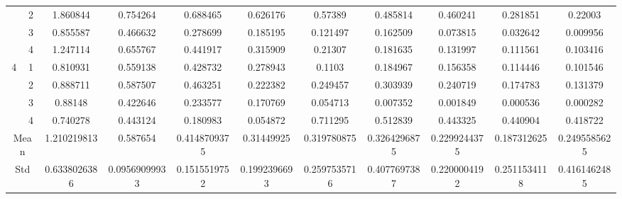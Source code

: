 \documentclass[draft,dvipsnames]{drexel-thesis}
\begin{document}
\begin{thesis}
\begin{table}[!t]
{\begin{tabular}{|c|c|c|c|c|c|c|c|c|c|c|}
                      & 2                   & 1.860844     & 0.754264      & 0.688465     & 0.626176     & 0.57389      & 0.485814     & 0.460241     & 0.281851     & 0.22003      \\ \cline{2-11}
                      & 3                   & 0.855587     & 0.466632      & 0.278699     & 0.185195     & 0.121497     & 0.162509     & 0.073815     & 0.032642     & 0.009956     \\ \cline{2-11}
                      & 4                   & 1.247114     & 0.655767      & 0.441917     & 0.315909     & 0.21307      & 0.181635     & 0.131997     & 0.111561     & 0.103416     \\ \hline
\multirow{4}{*}{4}    & 1                   & 0.810931     & 0.559138      & 0.428732     & 0.278943     & 0.1103       & 0.184967     & 0.156358     & 0.114446     & 0.101546     \\ \cline{2-11}
                      & 2                   & 0.888711     & 0.587507      & 0.463251     & 0.222382     & 0.249457     & 0.303939     & 0.240719     & 0.174783     & 0.131379     \\ \cline{2-11}
                      & 3                   & 0.88148      & 0.422646      & 0.233577     & 0.170769     & 0.054713     & 0.007352     & 0.001849     & 0.000536     & 0.000282     \\ \cline{2-11}
                      & 4                   & 0.740278     & 0.443124      & 0.180983     & 0.054872     & 0.711295     & 0.512839     & 0.443325     & 0.440904     & 0.418722     \\ \hline
\multicolumn{2}{|c|}{Mean}                  & 1.210219813  & 0.587654      & 0.4148709375 & 0.31449925   & 0.319780875  & 0.3264296875 & 0.2299244375 & 0.187312625  & 0.2495585625 \\ \hline
\multicolumn{2}{|c|}{Std}                   & 0.6338026386 & 0.09569099933 & 0.1515519752 & 0.1992396693 & 0.2597535716 & 0.4077697387 & 0.2200004192 & 0.2511534118 & 0.4161462485 \\ \hline
\end{tabular}}
\end{table}


\end{thesis}
\end{document}
